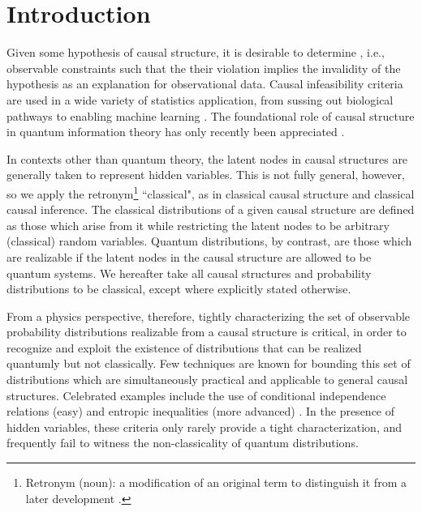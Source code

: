 \section{Introduction}
Given some hypothesis of causal structure, it is desirable to determine , i.e., observable constraints such that the their violation implies the invalidity of the hypothesis as an explanation for observational data. Causal infeasibility criteria are used in a wide variety of statistics application, from sussing out biological pathways to enabling machine learning \cite{pearl2009causality,spirtes2011causation,studeny2005probabilistic,koller2009probabilistic}.  The foundational role of causal structure in quantum information theory has only recently been appreciated \cite{WoodSpekkens,fritz2012bell,pusey2014gdag,BeyondBellII}.

In contexts other than quantum theory, the latent nodes in causal structures are generally taken to represent hidden variables. This is not fully general, however, so we apply the retronym\footnote{Retronym (noun): a modification of an original term to distinguish it from a later development \cite{retronym}.} ``classical", as in classical causal structure and classical causal inference. The classical distributions of a given causal structure are defined as those which arise from it while restricting the latent nodes to be arbitrary (classical) random variables. Quantum distributions, by contrast, are those which are realizable if the latent nodes in the causal structure are allowed to be quantum systems. We hereafter take all causal structures and probability distributions to be classical, except where explicitly stated otherwise.

From a physics perspective, therefore, tightly characterizing the set of observable probability distributions realizable from a causal structure is critical, in order to recognize and exploit the existence of distributions that can be realized quantumly but not classically. Few techniques are known for bounding this set of distributions which are simultaneously practical and applicable to general causal structures. Celebrated examples include the use of conditional independence relations (easy) \cite{pearl2009causality,spirtes2011causation,studeny2005probabilistic,koller2009probabilistic} and entropic inequalities (more advanced) \cite{fritz2013marginal,chaves2014novel,chaves2014informationinference}. In the presence of hidden variables, these criteria only rarely provide a tight characterization, and frequently fail to witness the non-classicality of quantum distributions.%

